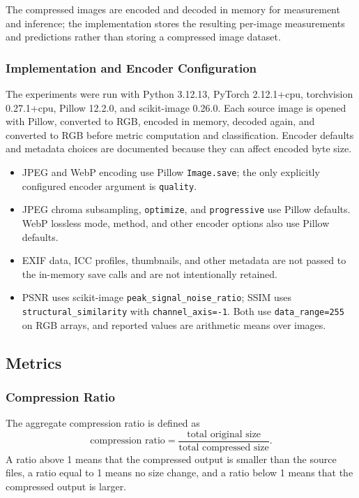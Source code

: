 The compressed images are encoded and decoded in memory for measurement and inference; the implementation stores the resulting per-image measurements and predictions rather than storing a compressed image dataset.

\subsubsection{Implementation and Encoder Configuration}

The experiments were run with Python 3.12.13, PyTorch 2.12.1+cpu, torchvision 0.27.1+cpu, Pillow 12.2.0, and scikit-image 0.26.0. Each source image is opened with Pillow, converted to RGB, encoded in memory, decoded again, and converted to RGB before metric computation and classification. Encoder defaults and metadata choices are documented because they can affect encoded byte size.

\begin{sloppypar}
\begin{itemize}
    \item JPEG and WebP encoding use Pillow \texttt{Image.save}; the only explicitly configured encoder argument is \texttt{quality}.
    \item JPEG chroma subsampling, \texttt{optimize}, and \texttt{progressive} use Pillow defaults. WebP lossless mode, method, and other encoder options also use Pillow defaults.
    \item EXIF data, ICC profiles, thumbnails, and other metadata are not passed to the in-memory save calls and are not intentionally retained.
    \item PSNR uses scikit-image \texttt{peak\_signal\_noise\_\allowbreak ratio}; SSIM uses \texttt{structural\_\allowbreak similarity} with \texttt{channel\_axis=-1}. Both use \texttt{data\_range=255} on RGB arrays, and reported values are arithmetic means over images.
\end{itemize}
\end{sloppypar}

\subsection{Metrics}

\subsubsection{Compression Ratio}

The aggregate compression ratio is defined as
\[
\text{compression ratio} =
\frac{\text{total original size}}{\text{total compressed size}}.
\]
A ratio above 1 means that the compressed output is smaller than the source files, a ratio equal to 1 means no size change, and a ratio below 1 means that the compressed output is larger.


